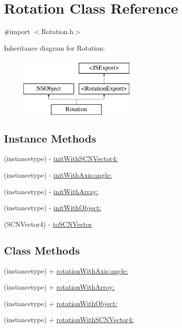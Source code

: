 \hypertarget{interface_rotation}{}\section{Rotation Class Reference}
\label{interface_rotation}


{\ttfamily \#import $<$Rotation.\+h$>$}

Inheritance diagram for Rotation\+:\begin{figure}[H]
\begin{center}
\leavevmode
\includegraphics[height=3.000000cm]{interface_rotation}
\end{center}
\end{figure}
\subsection*{Instance Methods}
\begin{DoxyCompactItemize}
\item 
(instancetype) -\/ \hyperlink{interface_rotation_ae225e3c745e1af9b5f4b45b8e69787b1}{init\+With\+S\+C\+N\+Vector4\+:}
\item 
(instancetype) -\/ \hyperlink{interface_rotation_adc30c08797dad425803591b479fbb0a9}{init\+With\+Axis\+:angle\+:}
\item 
(instancetype) -\/ \hyperlink{interface_rotation_ac4db195d01269b3d8b8459d6caf5354e}{init\+With\+Array\+:}
\item 
(instancetype) -\/ \hyperlink{interface_rotation_af6d1d9786e0501478b28e10d05a952f5}{init\+With\+Object\+:}
\item 
(S\+C\+N\+Vector4) -\/ \hyperlink{interface_rotation_a079207362ab6f7f20848edae188e2166}{to\+S\+C\+N\+Vector}
\end{DoxyCompactItemize}
\subsection*{Class Methods}
\begin{DoxyCompactItemize}
\item 
(instancetype) + \hyperlink{interface_rotation_a3d67423ac2a9965bb5441092a219ec61}{rotation\+With\+Axis\+:angle\+:}
\item 
(instancetype) + \hyperlink{interface_rotation_ab0183d252b595a575127ec196889fd01}{rotation\+With\+Array\+:}
\item 
(instancetype) + \hyperlink{interface_rotation_af1c2e6e36514024a6db11f6516fe8a17}{rotation\+With\+Object\+:}
\item 
(instancetype) + \hyperlink{interface_rotation_a7e9d0b44d26d58fe18e9a8ce5320fc8a}{rotation\+With\+S\+C\+N\+Vector4\+:}
\end{DoxyCompactItemize}


